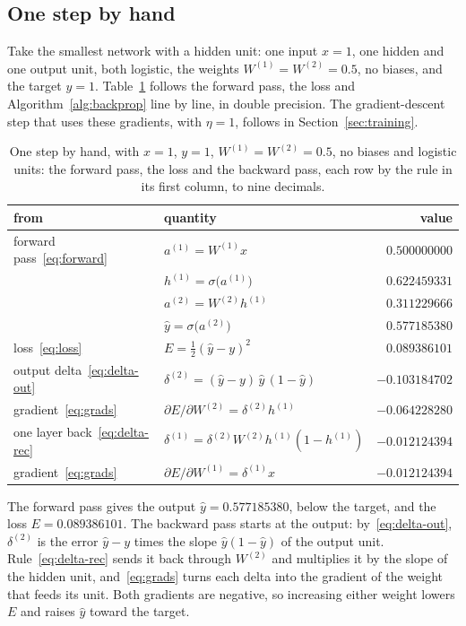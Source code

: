 \documentclass[11pt,a4paper]{amsart}
\numberwithin{equation}{section}
\theoremstyle{plain}
\theoremstyle{definition}
\theoremstyle{remark}
\begin{document}
\subsection{One step by hand}\label{sec:hand}

Take the smallest network with a hidden unit: one input $x = 1$, one
hidden and one output unit, both logistic, the weights
$W^{(1)} = W^{(2)} = 0.5$, no biases, and the target $y = 1$.
Table~\ref{tab:hand} follows the forward pass, the loss and
Algorithm~\ref{alg:backprop} line by line, in double precision. The
gradient-descent step that uses these gradients, with $\eta = 1$,
follows in Section~\ref{sec:training}.

\begin{table}[tbp]
  \centering\small
  \caption{One step by hand, with $x = 1$, $y = 1$,
    $W^{(1)} = W^{(2)} = 0.5$, no biases and logistic units: the forward
    pass, the loss and the backward pass, each row by the rule in its
    first column, to nine decimals.}
  \label{tab:hand}
  \begin{tabular}{@{}llr@{}}
    \toprule
    from & quantity & value \\
    \midrule
    forward pass~\eqref{eq:forward} & $a^{(1)} = W^{(1)} x$
      & $0.500000000$ \\
    & $h^{(1)} = \sigma\bigl(a^{(1)}\bigr)$ & $0.622459331$ \\
    & $a^{(2)} = W^{(2)} h^{(1)}$ & $0.311229666$ \\
    & $\hat y = \sigma\bigl(a^{(2)}\bigr)$ & $0.577185380$ \\
    loss~\eqref{eq:loss} & $E = \tfrac12 (\hat y - y)^2$
      & $0.089386101$ \\
    \addlinespace
    output delta~\eqref{eq:delta-out}
      & $\delta^{(2)} = (\hat y - y)\, \hat y\, (1 - \hat y)$
      & $-0.103184702$ \\
    gradient~\eqref{eq:grads}
      & $\partial E / \partial W^{(2)} = \delta^{(2)} h^{(1)}$
      & $-0.064228280$ \\
    one layer back~\eqref{eq:delta-rec}
      & $\delta^{(1)} = \delta^{(2)} W^{(2)} h^{(1)} (1 - h^{(1)})$
      & $-0.012124394$ \\
    gradient~\eqref{eq:grads}
      & $\partial E / \partial W^{(1)} = \delta^{(1)} x$
      & $-0.012124394$ \\
    \bottomrule
  \end{tabular}
\end{table}

The forward pass gives the output $\hat y = 0.577185380$, below the
target, and the loss $E = 0.089386101$. The backward pass starts at the
output: by~\eqref{eq:delta-out}, $\delta^{(2)}$ is the error
$\hat y - y$ times the slope $\hat y (1 - \hat y)$ of the output unit.
Rule~\eqref{eq:delta-rec} sends it back through $W^{(2)}$ and multiplies
it by the slope of the hidden unit, and~\eqref{eq:grads} turns each
delta into the gradient of the weight that feeds its unit. Both
gradients are negative, so increasing either weight lowers $E$ and
raises $\hat y$ toward the target.
\end{document}
